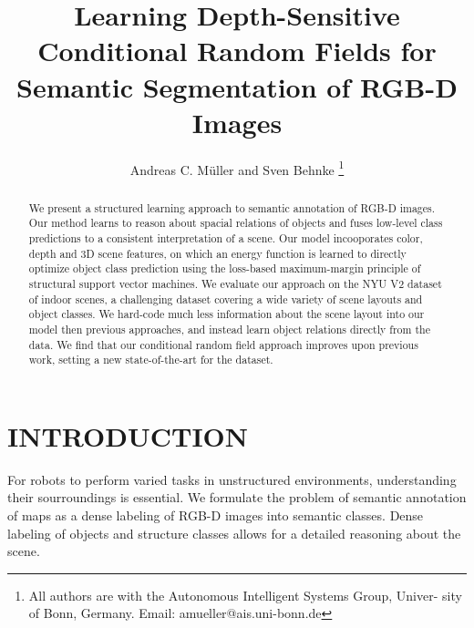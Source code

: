 \documentclass[a4paper, 10pt, conference]{ieeeconf}      %
\title{\LARGE \bf
Learning Depth-Sensitive Conditional Random Fields for Semantic Segmentation of RGB-D Images
}
\author{Andreas C. M\"uller and Sven Behnke
\thanks{All authors are with the Autonomous Intelligent Systems Group, Univer-
        sity of Bonn, Germany. Email: amueller@ais.uni-bonn.de
    }}
\begin{document}
\maketitle
\thispagestyle{empty}
\pagestyle{empty}


\begin{abstract}
    We present a structured learning approach to semantic annotation of RGB-D
    images. 
    Our method learns to reason about spacial relations of objects and
    fuses low-level class predictions to a consistent interpretation of a
    scene. Our model incooporates color, depth and 3D scene features, on which
    an energy function is learned to directly optimize object class prediction using
    the loss-based maximum-margin principle of structural support vector machines.
    We evaluate our approach on the NYU V2 dataset of indoor scenes, a challenging
    dataset covering a wide variety of scene layouts and object classes. We
    hard-code much less information about the scene layout into our model then previous
    approaches, and instead learn object relations directly from the data. We
    find that our conditional random field approach improves upon previous
    work, setting a new state-of-the-art for the dataset.
\end{abstract}


\section{INTRODUCTION}
For robots to perform varied tasks in unstructured environments, understanding their
sourroundings is essential. We formulate the problem of semantic annotation of maps
as a dense labeling of RGB-D images into semantic classes. Dense labeling of objects
and structure classes allows for a detailed reasoning about the scene.
\end{document}
